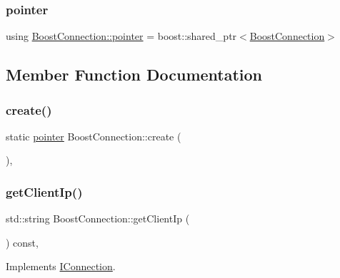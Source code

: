 \subsubsection{\texorpdfstring{pointer}{pointer}}
{\footnotesize\ttfamily using \mbox{\hyperlink{classBoostConnection_acaf86877128a2df13130110cf72de640}{Boost\+Connection\+::pointer}} =  boost\+::shared\+\_\+ptr$<$\mbox{\hyperlink{classBoostConnection}{Boost\+Connection}}$>$}



\subsection{Member Function Documentation}
\mbox{\label{classBoostConnection_a2f020a5317924e126c1495a86816f8ef}} 
\subsubsection{\texorpdfstring{create()}{create()}}
{\footnotesize\ttfamily static \mbox{\hyperlink{classBoostConnection_acaf86877128a2df13130110cf72de640}{pointer}} Boost\+Connection\+::create (\begin{DoxyParamCaption}{ }\end{DoxyParamCaption})\hspace{0.3cm}{\ttfamily [inline]}, {\ttfamily [static]}}

\mbox{\label{classBoostConnection_a648ba5a8674fc95b4cab8c94225a19e9}} 
\subsubsection{\texorpdfstring{get\+Client\+Ip()}{getClientIp()}}
{\footnotesize\ttfamily std\+::string Boost\+Connection\+::get\+Client\+Ip (\begin{DoxyParamCaption}{ }\end{DoxyParamCaption}) const\hspace{0.3cm}{\ttfamily [override]}, {\ttfamily [virtual]}}



Implements \mbox{\hyperlink{classIConnection_a7064757e5c427496f482239dde7e0540}{I\+Connection}}.


